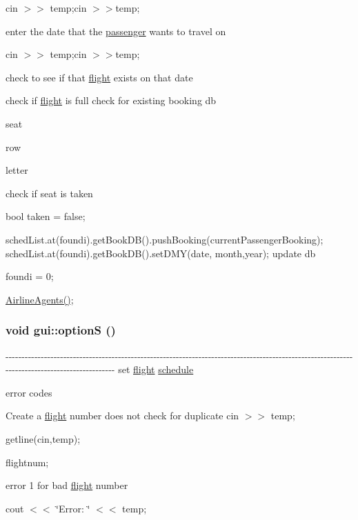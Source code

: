 cin $>$$>$ temp;cin $>$$>$temp;

enter the date that the \hyperlink{classpassenger}{passenger} wants to travel on

cin $>$$>$ temp;cin $>$$>$temp;

check to see if that \hyperlink{classflight}{flight} exists on that date

check if \hyperlink{classflight}{flight} is full check for existing booking db

seat

row

letter

check if seat is taken

bool taken = false;

schedList.at(foundi).getBookDB().pushBooking(currentPassengerBooking); schedList.at(foundi).getBookDB().setDMY(date, month,year); update db

foundi = 0;

\hyperlink{classgui_ae39757d1c6bdbfa938dbe3226a36febb}{AirlineAgents()}; \hypertarget{classgui_afa7a5fc9b6f835a69a0c8433711fad57}{
\subsubsection[{optionS}]{\setlength{\rightskip}{0pt plus 5cm}void gui::optionS ()}}
\label{classgui_afa7a5fc9b6f835a69a0c8433711fad57}
-\/-\/-\/-\/-\/-\/-\/-\/-\/-\/-\/-\/-\/-\/-\/-\/-\/-\/-\/-\/-\/-\/-\/-\/-\/-\/-\/-\/-\/-\/-\/-\/-\/-\/-\/-\/-\/-\/-\/-\/-\/-\/-\/-\/-\/-\/-\/-\/-\/-\/-\/-\/-\/-\/-\/-\/-\/-\/-\/-\/-\/-\/-\/-\/-\/-\/-\/-\/-\/-\/-\/-\/-\/-\/-\/-\/-\/-\/-\/-\/-\/-\/-\/-\/-\/-\/-\/-\/-\/-\/-\/-\/-\/-\/-\/-\/-\/-\/-\/-\/-\/-\/-\/-\/-\/-\/-\/-\/-\/-\/-\/-\/-\/-\/-\/-\/-\/-\/-\/-\/-\/-\/-\/-\/-\/-\/-\/-\/-\/-\/-\/-\/-\/-\/-\/-\/-\/-\/-\/-\/-\/-\/ set \hyperlink{classflight}{flight} \hyperlink{classschedule}{schedule} 

error codes

Create a \hyperlink{classflight}{flight} number does not check for duplicate cin $>$$>$ temp;

getline(cin,temp);

flightnum;

error 1 for bad \hyperlink{classflight}{flight} number

cout $<$$<$ \char`\"{}Error: \char`\"{} $<$$<$ temp;

